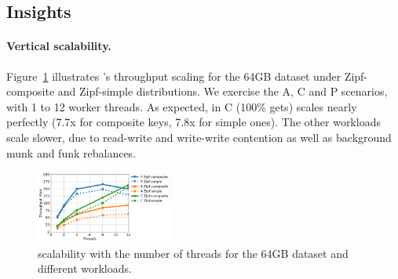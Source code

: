 \subsection{Insights}
\label{ssec:drill} 

\paragraph{Vertical scalability.} 
Figure~\ref{fig:scalability} illustrates \sys's throughput scaling for the 64GB dataset under Zipf-composite and Zipf-simple  
distributions. We exercise the A, C and P scenarios, with 1 to 12 worker threads.  
As expected, in C (100\% gets) \sys\/ scales nearly perfectly (7.7x for composite keys, 7.8x for simple ones). 
The other workloads scale slower, due to read-write and write-write contention as well as background munk and funk rebalances. 

\begin{figure}[th]
\centering
\includegraphics[width=0.4\textwidth]{figs/scalability_line.pdf}

\caption{{\sys\/ scalability with the number of threads for 
the 64GB dataset and different workloads. }}
\label{fig:scalability}
\end{figure}

